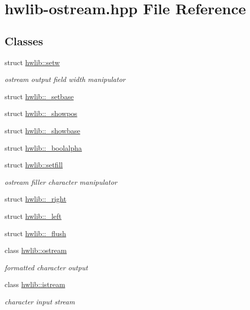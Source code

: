 \hypertarget{hwlib-ostream_8hpp}{}\section{hwlib-\/ostream.hpp File Reference}
\label{hwlib-ostream_8hpp}
\subsection*{Classes}
\begin{DoxyCompactItemize}
\item 
struct \hyperlink{structhwlib_1_1setw}{hwlib\+::setw}
\begin{DoxyCompactList}\small\item\em ostream output field width manipulator \end{DoxyCompactList}\item 
struct \hyperlink{structhwlib_1_1__setbase}{hwlib\+::\+\_\+setbase}
\item 
struct \hyperlink{structhwlib_1_1__showpos}{hwlib\+::\+\_\+showpos}
\item 
struct \hyperlink{structhwlib_1_1__showbase}{hwlib\+::\+\_\+showbase}
\item 
struct \hyperlink{structhwlib_1_1__boolalpha}{hwlib\+::\+\_\+boolalpha}
\item 
struct \hyperlink{structhwlib_1_1setfill}{hwlib\+::setfill}
\begin{DoxyCompactList}\small\item\em ostream filler character manipulator \end{DoxyCompactList}\item 
struct \hyperlink{structhwlib_1_1__right}{hwlib\+::\+\_\+right}
\item 
struct \hyperlink{structhwlib_1_1__left}{hwlib\+::\+\_\+left}
\item 
struct \hyperlink{structhwlib_1_1__flush}{hwlib\+::\+\_\+flush}
\item 
class \hyperlink{classhwlib_1_1ostream}{hwlib\+::ostream}
\begin{DoxyCompactList}\small\item\em formatted character output \end{DoxyCompactList}\item 
class \hyperlink{classhwlib_1_1istream}{hwlib\+::istream}
\begin{DoxyCompactList}\small\item\em character input stream \end{DoxyCompactList}\end{DoxyCompactItemize}
